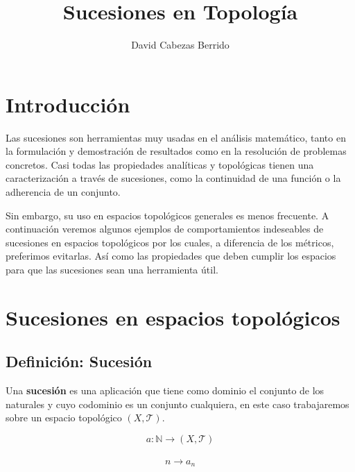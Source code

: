 \documentclass{article}
\begin{document}
\title{Sucesiones en Topología}
\author{David Cabezas Berrido}
\date{}
\maketitle

\section*{Introducción}

\begin{justify} Las sucesiones son herramientas muy usadas en el
  análisis matemático, tanto en la formulación y demostración de
  resultados como en la resolución de problemas concretos. Casi todas
  las propiedades analíticas y topológicas tienen una caracterización
  a través de sucesiones, como la continuidad de una función o la
  adherencia de un conjunto.
\end{justify}

\begin{justify} Sin embargo, su uso en espacios topológicos generales
  es menos frecuente. A continuación veremos algunos ejemplos de
  comportamientos indeseables de sucesiones en espacios topológicos
  por los cuales, a diferencia de los métricos, preferimos evitarlas.
  Así como las propiedades que deben cumplir los espacios para que las
  sucesiones sean una herramienta útil.
\end{justify}

\section*{Sucesiones en espacios topológicos}

\subsection*{Definición: Sucesión}

\begin{justify} Una \textbf{sucesión} es una aplicación que tiene como
  dominio el conjunto de los naturales y cuyo codominio es un conjunto
  cualquiera, en este caso trabajaremos sobre un espacio topológico
  $(X, \mathcal{T})$. \vspace{-4mm}
\end{justify}

\[a : \mathbb{N} \longrightarrow (X, \mathcal{T})\] \\ \vspace{-9mm}
\[n \longrightarrow a_n\]
\end{document}
